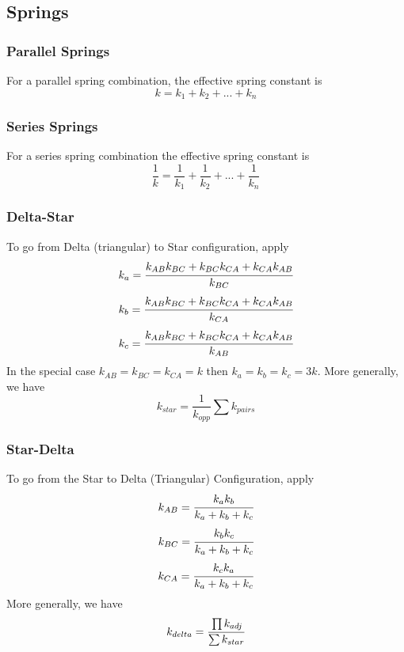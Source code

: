 \documentclass[../PhysicsFormulae.tex]{subfiles}
\begin{document}
\subsection{Springs}
\subsubsection{Parallel Springs}
For a parallel spring combination, the effective spring constant is
\[ k = k_1 + k_2 + ... + k_n\]

\subsubsection{Series Springs}
For a series spring combination the effective spring constant is 
\[ \frac{1}{k} = \frac{1}{k_1} + \frac{1}{k_2} +...+ \frac{1}{k_n} \]

\subsubsection{Delta-Star}

To go from Delta (triangular) to Star configuration, apply
\[k_a = \cfrac{k_{AB}k_{BC} + k_{BC}k_{CA} + k_{CA}k_{AB}}{k_{BC}}\]
\[k_b = \cfrac{k_{AB}k_{BC} + k_{BC}k_{CA} + k_{CA}k_{AB}}{k_{CA}}\]
\[k_c = \cfrac{k_{AB}k_{BC} + k_{BC}k_{CA} + k_{CA}k_{AB}}{k_{AB}}\]
In the special case $k_{AB}=k_{BC}=k_{CA}=k$ then $k_a=k_b=k_c=3k$.
More generally, we have
\[k_{star} = \frac{1}{k_{opp}}\sum k_{pairs} \]

\subsubsection{Star-Delta}
To go from the Star to Delta (Triangular) Configuration, apply
\[k_{AB} = \cfrac{k_a k_b}{k_a + k_b + k_c}\]
\[k_{BC} = \cfrac{k_b k_c}{k_a + k_b + k_c}\]
\[k_{CA} = \cfrac{k_c k_a}{k_a + k_b + k_c}\]
More generally, we have
\[k_{delta} = \cfrac{\prod k_{adj}}{\sum k_{star}} \]
\end{document}
